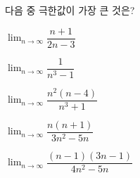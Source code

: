 다음 중 극한값이 가장 큰 것은?
\begin{choicesii}{\rule[-3ex]{0pt}{8ex}$\displaystyle\lim_{n\to\infty}\dfrac{n+1}{2n-3}$}{\rule[-3ex]{0pt}{8ex}$\displaystyle\lim_{n\to\infty}\dfrac{1}{n^3-1}$}{\rule[-3ex]{0pt}{8ex}$\displaystyle\lim_{n\to\infty}\dfrac{n^2(n-4)}{n^3+1}$}{\rule[-3ex]{0pt}{8ex}$\displaystyle\lim_{n\to\infty}\dfrac{n(n+1)}{3n^2-5n}$}{\rule[-3ex]{0pt}{8ex}$\displaystyle\lim_{n\to\infty}\dfrac{(n-1)(3n-1)}{4n^2-5n}$}\end{choicesii}
